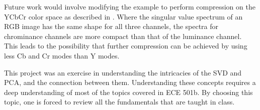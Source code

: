\documentclass[conference]{IEEEtran}
\begin{document}
    Future work would involve modifying the example to perform compression on the YCbCr color space as described in \cite{xu_color_conversion}. Where the singular value spectrum of an RGB image has the same shape for all three channels, the spectra for chrominance channels are more compact than that of the luminance channel. This leads to the possibility that further compression can be achieved by using less Cb and Cr modes than Y modes.

    This project was an exercise in understanding the intricacies of the SVD and PCA, and the connection between them. Understanding these concepts requires a deep understanding of most of the topics covered in ECE 501b. By choosing this topic, one is forced to review all the fundamentals that are taught in class.


    {}
    
\end{document}
